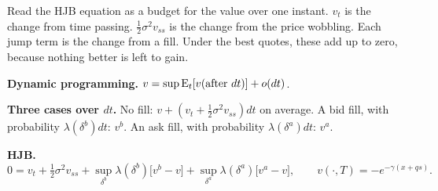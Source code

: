 \begin{intuition}
Read the HJB equation as a budget for the value over one instant. $v_t$ is the change from time passing. $\tfrac12\sigma^2v_{ss}$ is the change from the price wobbling. Each jump term is the change from a fill. Under the best quotes, these add up to zero, because nothing better is left to gain.
\end{intuition}

\begin{recall}
\textbf{Dynamic programming.} $v=\sup\operatorname{E}_t[v(\text{after }dt)]+o(dt)$.

\textbf{Three cases over $dt$.} No fill: $v+(v_t+\frac12\sigma^2v_{ss})dt$ on average. A bid fill, with probability $\lambda(\delta^b)dt$: $v^b$. An ask fill, with probability $\lambda(\delta^a)dt$: $v^a$.

\textbf{HJB.}
\[
  0=v_t+\tfrac12\sigma^2v_{ss}+\sup_{\delta^b}\lambda(\delta^b)\big[v^b-v\big]+\sup_{\delta^a}\lambda(\delta^a)\big[v^a-v\big],\qquad v(\cdot,T)=-e^{-\gamma(x+qs)}.
\]
\end{recall}
